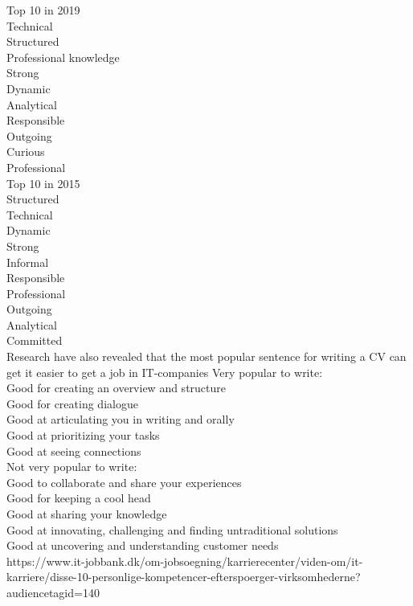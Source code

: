 Top 10 in 2019 \\

Technical \\
Structured \\
Professional knowledge \\
Strong \\
Dynamic \\
Analytical \\
Responsible \\
Outgoing \\
Curious \\
Professional \\

Top 10 in 2015 \\

Structured \\
Technical \\
Dynamic \\
Strong \\
Informal \\
Responsible \\
Professional \\
Outgoing \\
Analytical \\
Committed \\

Research have also revealed that the most popular sentence for writing a CV can get it easier to get a job in IT-companies
Very popular to write:\\

Good for creating an overview and structure \\
Good for creating dialogue\\
Good at articulating you in writing and orally \\
Good at prioritizing your tasks \\
Good at seeing connections \\

Not very popular to write: \\

Good to collaborate and share your experiences \\
Good for keeping a cool head \\
Good at sharing your knowledge \\
Good at innovating, challenging and finding untraditional solutions \\
Good at uncovering and understanding customer needs \\
https://www.it-jobbank.dk/om-jobsoegning/karrierecenter/viden-om/it-karriere/disse-10-personlige-kompetencer-efterspoerger-virksomhederne?audiencetagid=140

